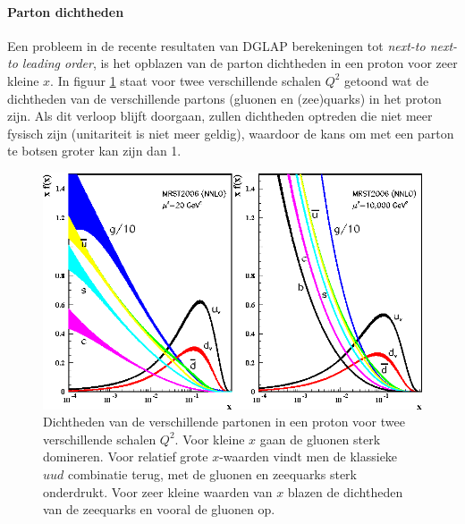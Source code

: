 \documentclass[a4paper,11pt]{article}
\numberwithin{equation}{section} %
\begin{document}
      \paragraph{Parton dichtheden}
Een probleem in de recente resultaten van DGLAP berekeningen tot \textit{next-to next-to leading order}, is het opblazen van de parton dichtheden in een proton voor zeer kleine $x$.
In figuur \ref{fig:PD} staat voor twee verschillende schalen $Q^2$ getoond wat de dichtheden van de verschillende partons (gluonen en (zee)quarks) in het proton zijn.
Als dit verloop blijft doorgaan, zullen dichtheden optreden die niet meer fysisch zijn (unitariteit is niet meer geldig), waardoor de kans om met een parton te botsen groter kan zijn dan 1.
\begin{figure} [H]
  \begin{center}
    \includegraphics[scale=1]{Afbeeldingen/PD.eps}
    \caption{Dichtheden van de verschillende partonen in een proton voor twee verschillende schalen $Q^2$. Voor kleine $x$ gaan de gluonen sterk domineren. Voor relatief grote $x$-waarden vindt men de klassieke $uud$ combinatie terug, met de gluonen en zeequarks sterk onderdrukt. Voor zeer kleine waarden van $x$ blazen de dichtheden van de zeequarks en vooral de gluonen op.\cite{Martin}}
   \label{fig:PD}
  \end{center}
\end{figure}
\end{document}
